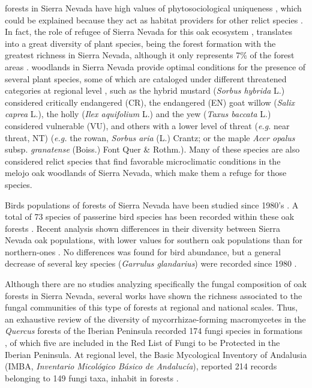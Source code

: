 \Qp forests in Sierra Nevada have high values of phytosociological uniqueness \autocites{Loriteetal2008PhytosociologicalReview}, which could be explained because they act as habitat providers for other relict species \autocites{Blancaetal1998ThreatenedVascular,Lorite2016UpdatedChecklist,Losaetal1986PaisajeVegetal}. In fact, the role of refugee of Sierra Nevada for this oak ecosystem \autocites{Breweretal2002SpreadDeciduous,Olaldeetal2002WhiteOaks,RodriguezSanchezetal2010TreeRange}, translates into a great diversity of plant species, being the forest formation with the greatest richness in Sierra Nevada, although it only represents 7\% of the forest areas \autocites{PerezLuqueetal2014SinfonevadaDataset}. \Qp woodlands in Sierra Nevada provide optimal conditions for the presence of several plant species, some of which are cataloged under different threatened categories at regional level \autocites{Lorite2016UpdatedChecklist,Losaetal1986PaisajeVegetal,MelendoValle2000EstudioComparativo}, such as the hybrid mustard (\emph{Sorbus hybrida} L.) considered critically endangered (CR), the endangered (EN) goat willow (\emph{Salix caprea} L.), the holly (\emph{Ilex aquifolium} L.) and the yew (\emph{Taxus baccata} L.) considered vulnerable (VU), and others with a lower level of threat (\emph{e.g.} near threat, NT) (\emph{e.g.} the rowan, \emph{Sorbus aria} (L.) Crantz; or the maple \emph{Acer opalus} subsp. \emph{granatense} (Boiss.) Font Quer \& Rothm.). Many of these species are also considered relict species that find favorable microclimatic conditions in the melojo oak woodlands of Sierra Nevada, which make them a refuge for those species.

Birds populations of \Qp forests of Sierra Nevada have been studied since 1980's \autocites{ZamoraCamacho1984EvolucionEstacional,ZamoraBareaAzcon2015LongTermChanges,BareaAzconetal2012PasseriformesOtras}. A total of 73 species of passerine bird species has been recorded within these oak forests \autocites{PerezLuqueetal2016DatasetPasserine}. Recent analysis shown differences in their diversity between Sierra Nevada oak populations, with lower values for southern oak populations than for northern-ones \autocites{PerezLuqueetal2021ManualGestion}. No differences was found for bird abundance, but a general decrease of several key species (\emph{Garrulus glandarius}) were recorded since 1980 \autocites{ZamoraBareaAzcon2015LongTermChanges}. 

Although there are no studies analyzing specifically the fungal composition of oak forests in Sierra Nevada, several works have shown the richness associated to the fungal communities of this type of forests at regional and national scales. Thus, an exhaustive review of the diversity of mycorrhizae-forming macromycetes in the \emph{Quercus} forests of the Iberian Peninsula recorded 174 fungi species in \Qp formations \autocites{Ortegaetal2010MycorrhizalMacrofungi}, of which five are included in the Red List of Fungi to be Protected in the Iberian Peninsula. At regional level, the Basic Mycological Inventory of Andalusia (IMBA, \emph{Inventario Micológico Básico de Andalucía}), reported 214 records belonging to 149 fungi taxa, inhabit in \Qp forests \autocites{MorenoArroyo2004InventarioMicologico}. 

